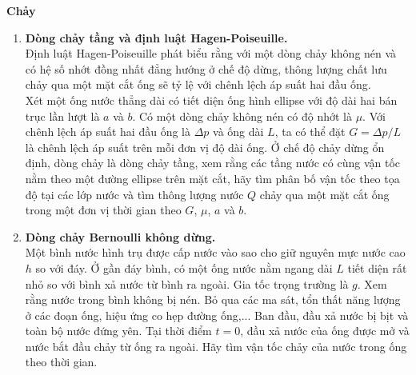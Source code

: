 \textbf{Chảy}

\begin{enumerate}
    \item \textbf{Dòng chảy tầng và định luật Hagen-Poiseuille.} \\
    Định luật Hagen-Poiseuille phát biểu rằng với một dòng chảy không nén và có hệ số nhớt đồng nhất đẳng hướng ở chế độ dừng, thông lượng chất lưu chảy qua một mặt cắt ống sẽ tỷ lệ với chênh lệch áp suất hai đầu ống. \\
    Xét một ống nước thẳng dài có tiết diện ống hình ellipse với độ dài hai bán trục lần lượt là $a$ và $b$. Có một dòng chảy không nén có độ nhớt là $\mu$. Với chênh lệch áp suất hai đầu ống là $\Delta p$ và ống dài $L$, ta có thể đặt $G=\Delta p/L$ là chênh lệch áp suất trên mỗi đơn vị độ dài ống. Ở chế độ chảy dừng ổn định, dòng chảy là dòng chảy tầng, xem rằng các tầng nước có cùng vận tốc nằm theo một đường ellipse trên mặt cắt, hãy tìm phân bố vận tốc theo tọa độ tại các lớp nước và tìm thông lượng nước $Q$ chảy qua một mặt cắt ống trong một đơn vị thời gian theo $G$, $\mu$, $a$ và $b$.
    \item \textbf{Dòng chảy Bernoulli không dừng.} \\
    Một bình nước hình trụ được cấp nước vào sao cho giữ nguyên mực nước cao $h$ so với đáy. Ở gần đáy bình, có một ống nước nằm ngang dài $L$ tiết diện rất nhỏ so với bình xả nước từ bình ra ngoài. Gia tốc trọng trường là $g$. Xem rằng nước trong bình không bị nén. Bỏ qua các ma sát, tổn thất năng lượng ở các đoạn ống, hiệu ứng co hẹp đường ống,... Ban đầu, đầu xả nước bị bịt và toàn bộ nước đứng yên. Tại thời điểm $t=0$, đầu xả nước của ống được mở và nước bắt đầu chảy từ ống ra ngoài. Hãy tìm vận tốc chảy của nước trong ống theo thời gian.
\end{enumerate}

